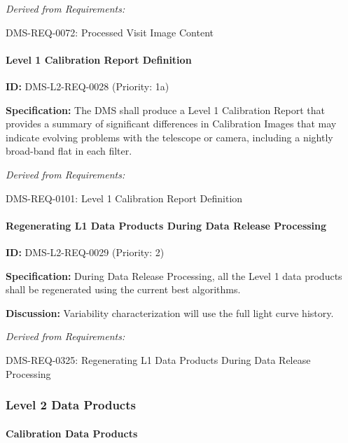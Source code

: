 \documentclass[SE,toc,lsstdraft]{lsstdoc}
\begin{document}
\emph{Derived from Requirements:}

DMS-REQ-0072:
Processed Visit Image Content \newline

\paragraph{Level 1 Calibration Report Definition}\hfill  %

\label{DMS-L2-REQ-0028}
\textbf{ID:} DMS-L2-REQ-0028 (Priority: 1a)

\textbf{Specification:} The DMS shall produce a Level 1 Calibration Report that provides a summary of significant differences in Calibration Images that may indicate evolving problems with the telescope or camera, including a nightly broad-band flat in each filter.

\emph{Derived from Requirements:}

DMS-REQ-0101:
Level 1 Calibration Report Definition \newline

\paragraph{Regenerating L1 Data Products During Data Release Processing}\hfill  %

\label{DMS-L2-REQ-0029}
\textbf{ID:} DMS-L2-REQ-0029 (Priority: 2)

\textbf{Specification:} During Data Release Processing, all the Level 1 data products shall be regenerated using the current best algorithms.

\textbf{Discussion:} Variability characterization will use the full light curve history.

\emph{Derived from Requirements:}

DMS-REQ-0325:
Regenerating L1 Data Products During Data Release Processing \newline

\subsubsection{Level 2 Data Products}

\paragraph{Calibration Data Products}\hfill  %
\end{document}
